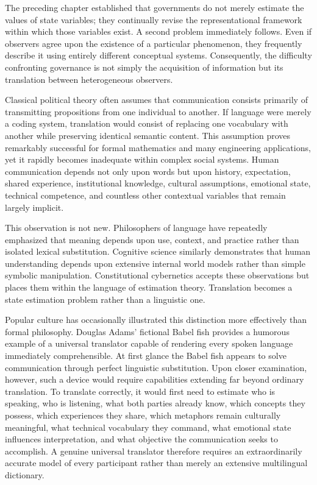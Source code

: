 \documentclass[12pt,a4paper]{article}
\begin{document}
The preceding chapter established that governments do not merely estimate the values of state variables; they continually revise the representational framework within which those variables exist. A second problem immediately follows. Even if observers agree upon the existence of a particular phenomenon, they frequently describe it using entirely different conceptual systems. Consequently, the difficulty confronting governance is not simply the acquisition of information but its translation between heterogeneous observers.

Classical political theory often assumes that communication consists primarily of transmitting propositions from one individual to another. If language were merely a coding system, translation would consist of replacing one vocabulary with another while preserving identical semantic content. This assumption proves remarkably successful for formal mathematics and many engineering applications, yet it rapidly becomes inadequate within complex social systems. Human communication depends not only upon words but upon history, expectation, shared experience, institutional knowledge, cultural assumptions, emotional state, technical competence, and countless other contextual variables that remain largely implicit.

This observation is not new. Philosophers of language have repeatedly emphasized that meaning depends upon use, context, and practice rather than isolated lexical substitution. Cognitive science similarly demonstrates that human understanding depends upon extensive internal world models rather than simple symbolic manipulation. Constitutional cybernetics accepts these observations but places them within the language of estimation theory. Translation becomes a state estimation problem rather than a linguistic one.

Popular culture has occasionally illustrated this distinction more effectively than formal philosophy. Douglas Adams' fictional Babel fish provides a humorous example of a universal translator capable of rendering every spoken language immediately comprehensible. At first glance the Babel fish appears to solve communication through perfect linguistic substitution. Upon closer examination, however, such a device would require capabilities extending far beyond ordinary translation. To translate correctly, it would first need to estimate who is speaking, who is listening, what both parties already know, which concepts they possess, which experiences they share, which metaphors remain culturally meaningful, what technical vocabulary they command, what emotional state influences interpretation, and what objective the communication seeks to accomplish. A genuine universal translator therefore requires an extraordinarily accurate model of every participant rather than merely an extensive multilingual dictionary.
\end{document}
